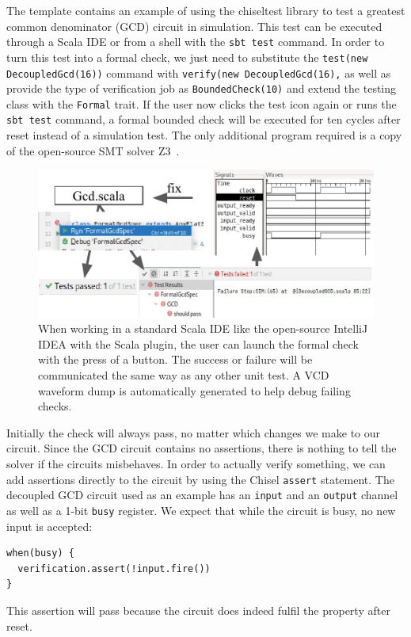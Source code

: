 \documentclass[conference]{IEEEtran}
\newcommand\scalainline[1]{\texttt{#1}}
\begin{document}
The template contains an example of using the chiseltest library to test a greatest common denominator (GCD) circuit in simulation.
This test can be executed through a Scala IDE or from a shell with the \scalainline{sbt test} command.
In order to turn this test into a formal check, we just need to substitute the \scalainline{test(new DecoupledGcd(16))}
command with \scalainline{verify(new DecoupledGcd(16),} as well as provide the type of verification job as
\scalainline{BoundedCheck(10)} and extend the testing class with the \scalainline{Formal} trait.
If the user now clicks the test icon again or runs the \scalainline{sbt test} command, a formal bounded check will
be executed for ten cycles after reset instead of a simulation test.
The only additional program required is a copy of the open-source SMT solver Z3~\cite{de2008z3}.



\begin{figure}
\centering
\includegraphics{woset_formal_ide_flow.pdf}
\caption{When working in a standard Scala IDE like the open-source IntelliJ IDEA with the Scala plugin, the user can launch the formal check with the press of a button.
The success or failure will be communicated the same way as any other unit test. A VCD waveform dump is automatically generated to help debug failing checks.}
\label{fig:ide-flow}
\end{figure}

Initially the check will always pass, no matter which changes we make to our circuit.
Since the GCD circuit contains no assertions, there is nothing to tell the solver if the circuits misbehaves.
In order to actually verify something, we can add assertions directly to the circuit by using the
Chisel \scalainline{assert} statement.
The decoupled GCD circuit used as an example has an \scalainline{input} and an \scalainline{output} channel
as well as a 1-bit \scalainline{busy} register.
We expect that while the circuit is busy, no new input is accepted:
\begin{verbatim}
when(busy) {
  verification.assert(!input.fire())
}
\end{verbatim}
This assertion will pass because the circuit does indeed fulfil the property after reset.
\end{document}
